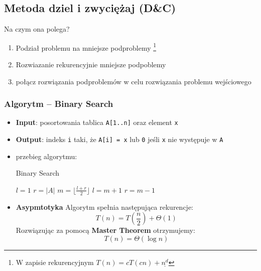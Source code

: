 \documentclass[11pt,a4paper]{article}
\begin{document}
\subsection{Metoda dziel i zwyciężaj (D\&C)}
Na czym ona polega?
\begin{enumerate}
    \item Podział problemu na mniejsze podproblemy \footnote{W zapisie rekurencyjnym $T(n) = cT(cn) + \underline{n^d}$}
    \item Rozwiazanie rekurencyjnie mniejsze podpoblemy
    \item połącz rozwiązania podproblemów w celu rozwiązania problemu wejściowego
\end{enumerate}
\subsubsection{Algorytm -- Binary Search}
\begin{itemize}
    \item \textbf{Input}: posortowania tablica \texttt{A[1..n]} oraz element \texttt{x}
    \item \textbf{Output}: indeks \texttt{i} taki, że \texttt{A[i] = x} lub \texttt{0} jeśli \texttt{x} nie występuje w \texttt{A}
    \item przebieg algorytmu: %
        \begin{algorithm}[H]
            \caption{Binary Search}
            \begin{algorithmic}[1]
                \State $l = 1$
                \State $r = |A|$
                \State $m = \lfloor \frac{l+r}{2} \rfloor$
                \State {}
                \State $l = m + 1$
                \Else
                \State $r = m - 1$
                \EndIf
                \EndWhile
                \State {}
                \EndProcedure
            \end{algorithmic}
        \end{algorithm}
    \item \textbf{Asypmtotyka}
        Algorytm spełnia następująca rekurencje:
        \[
            T(n) = T(\frac{n}{2}) + \Theta(1)
        \]
        Rozwiązując za pomocą \textbf{Master Theorem} otrzymujemy:
        \[
            T(n) = \Theta(\log n)
        \]
\end{itemize}
\end{document}
